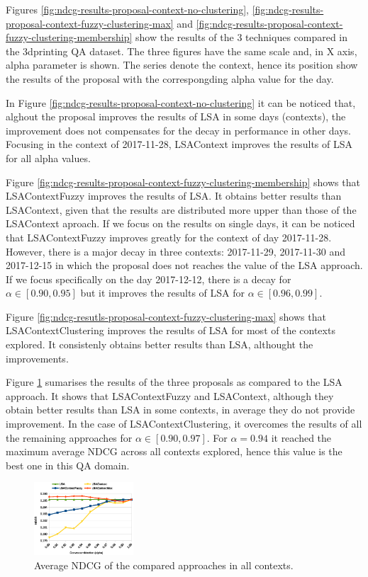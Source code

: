 \documentclass[preprint]{elsarticle}
\begin{document}
\begin{spacing}{2}
Figures \ref{fig:ndcg-results-proposal-context-no-clustering}, \ref{fig:ndcg-results-proposal-context-fuzzy-clustering-max} and \ref{fig:ndcg-results-proposal-context-fuzzy-clustering-membership} show the results of the 3 techniques compared in the 3dprinting QA dataset. The three figures have the same scale and, in X axis, alpha parameter is shown. The series denote the context, hence its position show the results of the proposal with the correspongding alpha value for the day.

In Figure \ref{fig:ndcg-results-proposal-context-no-clustering} it can be noticed that, alghout the proposal improves the results of LSA in some days (contexts), the improvement does not compensates for the decay in performance in other days. Focusing in the context of 2017-11-28, LSAContext improves the results of LSA for all alpha values.

Figure \ref{fig:ndcg-results-proposal-context-fuzzy-clustering-membership} shows that LSAContextFuzzy improves the results of LSA. It obtains better results than LSAContext, given that the results are distributed more upper than those of the LSAContext aproach. If we focus on the results on single days, it can be noticed that LSAContextFuzzy improves greatly for the context of day 2017-11-28. However, there is a major decay in three contexts: 2017-11-29, 2017-11-30 and 2017-12-15 in which the proposal does not reaches the value of the LSA approach. If we focus specifically on the day 2017-12-12, there is a decay for $\alpha \in [0.90,0.95]$ but it improves the results of LSA for $\alpha \in [0.96,0.99]$.

Figure \ref{fig:ndcg-resutls-proposal-context-fuzzy-clustering-max} shows that LSAContextClustering improves the results of LSA for most of the contexts explored. It consistenly obtains better results than LSA, althought the improvements.

Figure \ref{fig:ndcg-results-3proposals-average} sumarises the results of the three proposals as compared to the LSA approach. It shows that LSAContextFuzzy and LSAContext, although they obtain better results than LSA in some contexts, in average they do not provide improvement. In the case of LSAContextClustering, it overcomes the results of all the remaining approaches for $\alpha \in [0.90,0.97]$. For $\alpha=0.94$ it reached the maximum average NDCG across all contexts explored, hence this value is the best one in this QA domain.

\begin{figure}[htb]
    \centering
    \includegraphics[width=0.33\textwidth]{figures/ndcg-results-3proposals-average.eps}
    \caption{Average NDCG of the compared approaches in all contexts.}
    \label{fig:ndcg-results-3proposals-average}
\end{figure}


\end{spacing}
\end{document}
